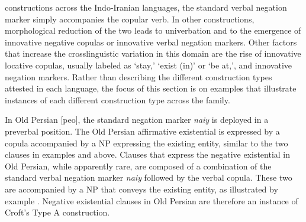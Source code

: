 \documentclass[output=paper]{langsci/langscibook}
\begin{document}
constructions across the Indo-Iranian languages, the standard verbal
negation marker simply accompanies the copular verb. In other
constructions, morphological reduction of the two leads to univerbation and
to the emergence of innovative negative copulas or innovative verbal
negation markers. Other factors that increase the crosslinguistic variation
in this domain are the rise of innovative locative copulas, usually labeled
as `stay,' `exist (in)' or `be at,', and innovative negation markers.
Rather than describing the different construction types attested in each
language, the focus of this section is on examples that illustrate
instances of each different construction type across the family.

In Old Persian [peo], the standard negation marker \textit{naiy} is
deployed in a preverbal position. The Old Persian affirmative existential
is expressed by a copula accompanied by a NP expressing the existing
entity, similar to the two clauses in examples 
and  above. Clauses that express the
negative existential in
Old Persian, while apparently rare, are composed of a combination of the
standard verbal negation marker \textit{naiy} followed by the verbal
copula. These two are accompanied by a NP that conveys the existing entity,
as illustrated by example . Negative
existential clauses in Old Persian are therefore an instance of Croft's
Type A construction.
%
\begin{exe}
\end{exe}
\end{document}
